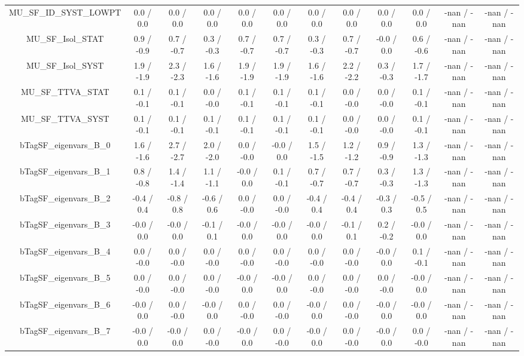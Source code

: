 \begin{table}[htbp]
\begin{center}
\begin{tabular}{|c|c|c|c|c|c|c|c|c|c|c|c|}
  MU_SF_ID_SYST_LOWPT & 0.0 / 0.0 & 0.0 / 0.0 & 0.0 / 0.0 & 0.0 / 0.0 & 0.0 / 0.0 & 0.0 / 0.0 & 0.0 / 0.0 & 0.0 / 0.0 & 0.0 / 0.0 & -nan / -nan & -nan / -nan \\ 
  MU_SF_Isol_STAT & 0.9 / -0.9 & 0.7 / -0.7 & 0.3 / -0.3 & 0.7 / -0.7 & 0.7 / -0.7 & 0.3 / -0.3 & 0.7 / -0.7 & -0.0 / 0.0 & 0.6 / -0.6 & -nan / -nan & -nan / -nan \\ 
  MU_SF_Isol_SYST & 1.9 / -1.9 & 2.3 / -2.3 & 1.6 / -1.6 & 1.9 / -1.9 & 1.9 / -1.9 & 1.6 / -1.6 & 2.2 / -2.2 & 0.3 / -0.3 & 1.7 / -1.7 & -nan / -nan & -nan / -nan \\ 
  MU_SF_TTVA_STAT & 0.1 / -0.1 & 0.1 / -0.1 & 0.0 / -0.0 & 0.1 / -0.1 & 0.1 / -0.1 & 0.1 / -0.1 & 0.0 / -0.0 & 0.0 / -0.0 & 0.1 / -0.1 & -nan / -nan & -nan / -nan \\ 
  MU_SF_TTVA_SYST & 0.1 / -0.1 & 0.1 / -0.1 & 0.1 / -0.1 & 0.1 / -0.1 & 0.1 / -0.1 & 0.1 / -0.1 & 0.0 / -0.0 & 0.0 / -0.0 & 0.1 / -0.1 & -nan / -nan & -nan / -nan \\ 
  bTagSF_eigenvars_B_0 & 1.6 / -1.6 & 2.7 / -2.7 & 2.0 / -2.0 & 0.0 / -0.0 & -0.0 / 0.0 & 1.5 / -1.5 & 1.2 / -1.2 & 0.9 / -0.9 & 1.3 / -1.3 & -nan / -nan & -nan / -nan \\ 
  bTagSF_eigenvars_B_1 & 0.8 / -0.8 & 1.4 / -1.4 & 1.1 / -1.1 & -0.0 / 0.0 & 0.1 / -0.1 & 0.7 / -0.7 & 0.7 / -0.7 & 0.3 / -0.3 & 1.3 / -1.3 & -nan / -nan & -nan / -nan \\ 
  bTagSF_eigenvars_B_2 & -0.4 / 0.4 & -0.8 / 0.8 & -0.6 / 0.6 & 0.0 / -0.0 & 0.0 / -0.0 & -0.4 / 0.4 & -0.4 / 0.4 & -0.3 / 0.3 & -0.5 / 0.5 & -nan / -nan & -nan / -nan \\ 
  bTagSF_eigenvars_B_3 & -0.0 / 0.0 & -0.0 / 0.0 & -0.1 / 0.1 & -0.0 / 0.0 & -0.0 / 0.0 & -0.0 / 0.0 & -0.1 / 0.1 & 0.2 / -0.2 & -0.0 / 0.0 & -nan / -nan & -nan / -nan \\ 
  bTagSF_eigenvars_B_4 & 0.0 / -0.0 & 0.0 / -0.0 & 0.0 / -0.0 & 0.0 / -0.0 & 0.0 / -0.0 & 0.0 / -0.0 & 0.0 / -0.0 & -0.0 / 0.0 & 0.1 / -0.1 & -nan / -nan & -nan / -nan \\ 
  bTagSF_eigenvars_B_5 & 0.0 / -0.0 & 0.0 / -0.0 & 0.0 / -0.0 & -0.0 / 0.0 & -0.0 / 0.0 & 0.0 / -0.0 & 0.0 / -0.0 & 0.0 / -0.0 & -0.0 / 0.0 & -nan / -nan & -nan / -nan \\ 
  bTagSF_eigenvars_B_6 & -0.0 / 0.0 & 0.0 / -0.0 & -0.0 / 0.0 & 0.0 / -0.0 & 0.0 / -0.0 & -0.0 / 0.0 & 0.0 / -0.0 & -0.0 / 0.0 & -0.0 / 0.0 & -nan / -nan & -nan / -nan \\ 
  bTagSF_eigenvars_B_7 & -0.0 / 0.0 & -0.0 / 0.0 & 0.0 / -0.0 & -0.0 / 0.0 & 0.0 / -0.0 & -0.0 / 0.0 & 0.0 / -0.0 & -0.0 / 0.0 & 0.0 / -0.0 & -nan / -nan & -nan / -nan \\ 

\end{tabular}
\end{center}
\end{table}
